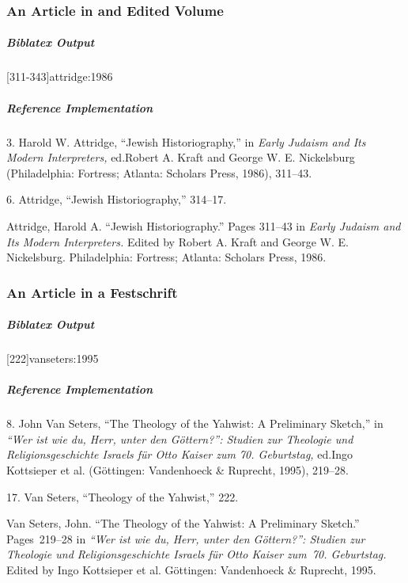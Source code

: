 \documentclass[a4paper]{article}
\newenvironment{biboutput}{%
  \subparagraph{Biblatex Output}
}{\color{black}}
\newenvironment{refimp}{%
  \subparagraph{Reference Implementation}
  \color{reference-colour}
  \rm
}{\par\color{black}}
\begin{document}
\subsubsection{An Article in and Edited Volume}

\begin{biboutput}
  [311-343]{attridge:1986}
\end{biboutput}

\begin{refimp}
  \hspace*{\bibindent}3. Harold W. Attridge, “Jewish Historiography,” in
  \emph{Early Judaism and Its Modern Interpreters,} ed.\@ Robert A. Kraft and
  George W. E. Nickelsburg (Philadelphia: Fortress; Atlanta: Scholars Press,
  1986), 311–43.
  
  \hspace*{\bibindent}6. Attridge, “Jewish Historiography,” 314–17.

  Attridge, Harold A. “Jewish Historiography.” Pages 311–43 in \emph{Early
  Judaism and Its Modern Interpreters.} Edited by Robert A. Kraft and George
  W. E. Nickelsburg. Philadelphia: Fortress; Atlanta: Scholars Press, 1986.
\end{refimp}

\subsubsection{An Article in a Festschrift}

\begin{biboutput}
  [222]{vanseters:1995}
\end{biboutput}

\begin{refimp}
  \hspace*{\bibindent}8. John Van Seters, “The Theology of the Yahwist: A
  Preliminary Sketch,” in \emph{“Wer ist wie du, Herr, unter den Göttern?”:
  Studien zur Theologie und Religionsgeschichte Israels für Otto Kaiser zum
  70. Geburtstag,} ed.\@ Ingo Kottsieper et al. (Göttingen: Vandenhoeck \&
  Ruprecht, 1995), 219–28.

  \hspace*{\bibindent}17. Van Seters, “Theology of the Yahwist,” 222.

  \hangindent\bibindent Van Seters, John. “The Theology of the Yahwist: A
  Preliminary Sketch.” Pages~219–28 in \emph{“Wer ist wie du, Herr, unter den
  Göttern?”: Studien zur Theologie und Religionsgeschichte Israels für Otto
  Kaiser zum~70. Geburtstag.} Edited by Ingo Kottsieper et al. Göttingen:
  Vandenhoeck \& Ruprecht, 1995.
\end{refimp}
\end{document}
